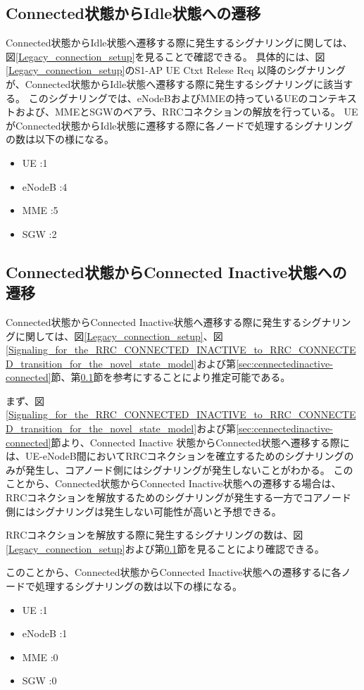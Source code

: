 \documentclass[a4j]{ujarticle}
\begin{document}
\subsection{Connected状態からIdle状態への遷移}
\label{sec:connected-idle}
Connected状態からIdle状態へ遷移する際に発生するシグナリングに関しては、図\ref{Legacy_connection_setup}を見ることで確認できる。
具体的には、図\ref{Legacy_connection_setup}のS1-AP UE Ctxt Relese Req 以降のシグナリングが、Connected状態からIdle状態へ遷移する際に発生するシグナリングに該当する。
このシグナリングでは、eNodeBおよびMMEの持っているUEのコンテキストおよび、MMEとSGWのベアラ、RRCコネクションの解放を行っている。
UEがConnected状態からIdle状態に遷移する際に各ノードで処理するシグナリングの数は以下の様になる。
\begin{itemize}
  \item UE      :1
  \item eNodeB  :4
  \item MME     :5
  \item SGW     :2
\end{itemize}
\subsection{Connected状態からConnected Inactive状態への遷移}
\label{sec:connected-connectedinactive}
Connected状態からConnected Inactive状態へ遷移する際に発生するシグナリングに関しては、図\ref{Legacy_connection_setup}、図\ref{Signaling_for_the_RRC_CONNECTED_INACTIVE_to_RRC_CONNECTED_transition_for_the_novel_state_model}および第\ref{sec:cennectedinactive-connected}節、第\ref{sec:connected-idle}節を参考にすることにより推定可能である。

まず、図\ref{Signaling_for_the_RRC_CONNECTED_INACTIVE_to_RRC_CONNECTED_transition_for_the_novel_state_model}および第\ref{sec:cennectedinactive-connected}節より、Connected Inactive 状態からConnected状態へ遷移する際には、UE-eNodeB間においてRRCコネクションを確立するためのシグナリングのみが発生し、コアノード側にはシグナリングが発生しないことがわかる。
このことから、Connected状態からConnected Inactive状態への遷移する場合は、RRCコネクションを解放するためのシグナリングが発生する一方でコアノード側にはシグナリングは発生しない可能性が高いと予想できる。

RRCコネクションを解放する際に発生するシグナリングの数は、図\ref{Legacy_connection_setup}および第\ref{sec:connected-idle}節を見ることにより確認できる。

このことから、Connected状態からConnected Inactive状態への遷移するに各ノードで処理するシグナリングの数は以下の様になる。
\begin{itemize}
  \item UE      :1
  \item eNodeB  :1
  \item MME     :0
  \item SGW     :0
\end{itemize}
\end{document}
